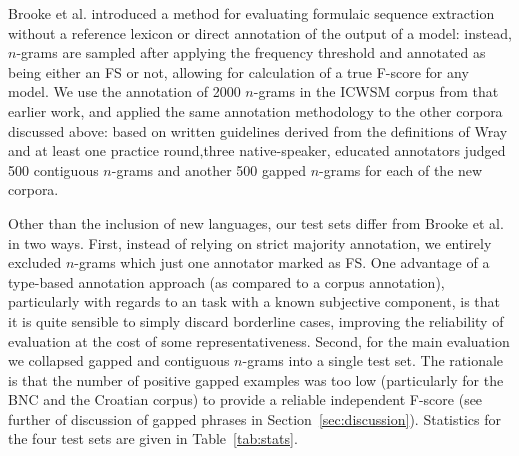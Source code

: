 \documentclass[11pt]{article}
\makeatletter
\def \al {al.\@ }
\newcommand{\tabref}[2][]{Table#1~\ref{#2}\xspace}
\newcommand{\secref}[2][]{Section#1~\ref{#2}\xspace}
\makeatother
\begin{document}
Brooke et \al {} introduced a method for evaluating formulaic sequence extraction without a reference lexicon or direct annotation of the output of a model: instead, $n$-grams are sampled after applying the frequency threshold and annotated as being either an FS or not, allowing for calculation of a true F-score for any model. We use the annotation of 2000 $n$-grams in the ICWSM corpus from that earlier work, and applied the same annotation methodology to the other corpora discussed above: based on written guidelines derived from the definitions of Wray \cite{Wray08} and at least one practice round,three native-speaker, educated annotators judged 500 contiguous $n$-grams and another 500 gapped $n$-grams for each of the new corpora. 

Other than the inclusion of new languages, our test sets differ from Brooke et \al {} in two ways. First, instead of relying on strict majority annotation, we entirely excluded $n$-grams which just one annotator marked as FS. One advantage of a type-based annotation approach (as compared to a corpus annotation), particularly with regards to an task with a known subjective component, is that it is quite sensible to simply discard borderline cases, improving the reliability of evaluation at the cost of some representativeness.  Second, for the main evaluation we collapsed gapped and contiguous $n$-grams into a single test set. The rationale is that the number of positive gapped examples was too low (particularly for the BNC and the Croatian corpus) to provide a reliable independent F-score (see further of discussion of gapped phrases in \secref{sec:discussion}). Statistics for the four test sets are given in \tabref{tab:stats}.




\end{document}
